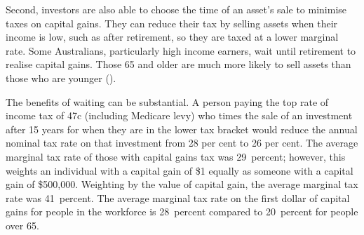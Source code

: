 \documentclass{grattan}\usepackage[]{graphicx}\usepackage[]{color}
\begin{document}
Second, investors are also able to choose the time of an asset's sale to minimise taxes on capital gains. They can reduce their tax by selling assets when their income is low, such as after retirement, so they are taxed at a lower marginal rate. Some Australians, particularly high income earners, wait until retirement to realise capital gains. Those 65 and older are much more likely to sell assets than those who are younger ().



The benefits of waiting can be substantial. A person paying the top rate of income tax of 47c (including Medicare levy) who times the sale of an investment after 15 years for when they are in the lower tax bracket would reduce the annual nominal tax rate on that investment from 28 per cent to 26 per cent. The average marginal tax rate of those with capital gains tax was 29~percent; however, this weights an individual with a capital gain of \$1 equally as someone with a capital gain of \$500,000. Weighting by the value of capital gain, the average marginal tax rate was 41~percent. The average marginal tax rate on the first dollar of capital gains for people in the workforce is 28~percent compared to 20~percent for people over 65.
\end{document}
